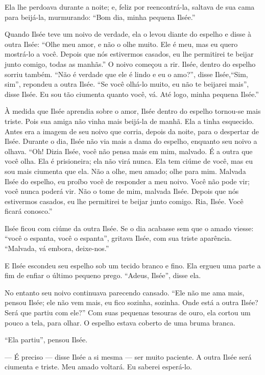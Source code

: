 Ela lhe perdoava durante a noite; e, feliz por reencontrá-la,
saltava de sua cama para beijá-la, murmurando: “Bom dia, minha pequena
Ilsée.”

Quando Ilsée teve um noivo de verdade, ela o levou diante do espelho e
disse à outra Ilsée: “Olhe meu amor, e não o olhe muito. Ele é meu, mas eu
quero mostrá-lo a você. Depois que nós estivermos casados, eu lhe
permitirei te beijar junto comigo, todas as manhãs.” O noivo começou a
rir. Ilsée, dentro do espelho sorriu também. “Não é verdade que ele é 
lindo e eu o amo?”, disse Ilsée,``Sim, sim”, repondeu a outra Ilsée.
“Se você olhá-lo muito, eu não te beijarei mais'', disse Ilsée. Eu sou 
tão ciumenta quanto você, vá. Até logo, minha pequena Ilsée.”

À medida que Ilsée aprendia sobre o amor, Ilsée dentro do espelho
tornou-se mais triste. Pois sua amiga não vinha mais beijá-la de manhã.
Ela a tinha esquecido. Antes era a imagem de seu noivo que corria,
depois da noite, para o despertar de Ilsée. Durante o dia, Ilsée não via
mais a dama do espelho, enquanto seu noivo a olhava. “Oh! Dizia Ilsée,
você não pensa mais em mim, malvado. É a outra que você olha. Ela é
prisioneira; ela não virá nunca. Ela tem ciúme de você, mas eu sou mais
ciumenta que ela. Não a olhe, meu amado; olhe para mim. Malvada Ilsée do
espelho, eu proíbo você de responder a meu noivo. Você não pode vir; você
nunca poderá vir. Não o tome de mim, malvada Ilsée. Depois que nós
estivermos casados, eu lhe permitirei te beijar junto comigo. Ria, Ilsée.
Você ficará conosco.”

Ilsée ficou com ciúme da outra Ilsée. Se o dia acabasse sem que o amado
viesse: ``você o espanta, você o espanta'', gritava Ilsée, com sua triste
aparência. ``Malvada, vá embora, deixe-nos.''

E Ilsée escondeu seu espelho sob um tecido branco e fino. Ela ergueu
uma parte a fim de enfiar o último pequeno prego. “Adeus, Ilsée”, disse
ela.

No entanto seu noivo continuava parecendo cansado. “Ele não me ama
mais, pensou Ilsée; ele não vem mais, eu fico sozinha, sozinha. Onde está
a outra Ilsée? Será que partiu com ele?” Com suas pequenas tesouras de ouro,
ela cortou um pouco a tela, para olhar. O espelho estava coberto de uma
bruma branca.

“Ela partiu”, pensou Ilsée.

--- É preciso --- disse Ilsée a si mesma --- ser muito paciente. A outra Ilsée será
ciumenta e triste. Meu amado voltará. Eu saberei esperá-lo.

